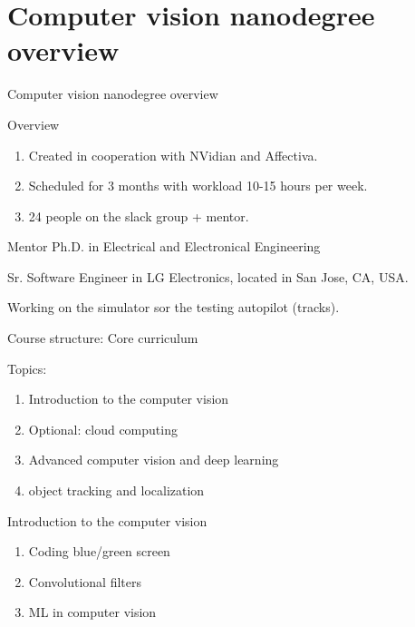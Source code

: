 \documentclass{beamer}
\begin{document}
\section{Computer vision nanodegree overview}

\begin{frame}
\begin{center}
\huge Computer vision nanodegree overview
\end{center}
\end{frame}

\begin{frame}{Overview}
\begin{enumerate}
\item Created in cooperation with NVidian and Affectiva.
\item Scheduled for 3 months with workload 10-15 hours per week.
\item 24 people on the slack group + mentor.
\end{enumerate}
\end{frame}

\begin{frame}{Mentor}
Ph.D. in Electrical and Electronical Engineering

Sr. Software Engineer in LG Electronics, located in San Jose, CA, USA.

Working on the simulator sor the testing autopilot (tracks).
\end{frame}


\begin{frame}{Course structure: Core curriculum}

Topics:
\begin{enumerate}
\item Introduction to the computer vision
\item Optional: cloud computing
\item Advanced computer vision and deep learning
\item object tracking and localization
\end{enumerate}
\end{frame}

\begin{frame}{Introduction to the computer vision}
\begin{enumerate}
\item Coding blue/green screen
\item Convolutional filters
\item ML in computer vision
\end{enumerate}
\end{frame}
\end{document}
